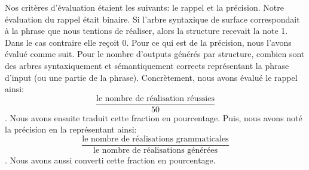 

Nos critères d'évaluation étaient les suivants: le rappel et la précision. Notre évaluation du rappel était binaire. Si l'arbre syntaxique de surface correspondait à la phrase que nous tentions de réaliser, alors la structure recevait la note 1. Dans le cas contraire elle reçoit 0. Pour ce qui est de la précision, nous l'avons évalué comme suit. Pour le nombre d'outputs générés par structure, combien sont des arbres syntaxiquement et sémantiquement corrects représentant la phrase d'input (ou une partie de la phrase). Concrètement, nous avons évalué le rappel ainsi: \[\frac{\text{le nombre de réalisation réussies}}{50}\]. Nous avons ensuite traduit cette fraction en pourcentage. Puis, nous avons noté la précision en la représentant ainsi:\[\frac{\text{le nombre de réalisations grammaticales}}{\text{le nombre de réalisations générées}}\]. Nous avons aussi converti cette fraction en pourcentage.

